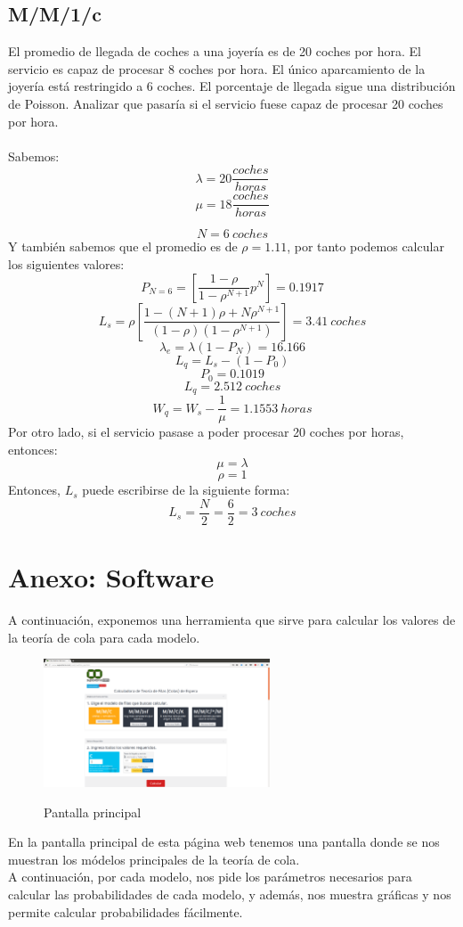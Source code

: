 \subsection{M/M/1/c}
El promedio de llegada de coches a una joyería es de 20 coches por hora. El servicio es capaz de procesar 8 coches por hora. El único aparcamiento de la joyería está restringido a 6 coches. El porcentaje de llegada sigue una distribución de Poisson. Analizar que pasaría si el servicio fuese capaz de procesar 20 coches por hora. \\ \\
Sabemos:
$$\lambda=20 \frac{coches}{horas} $$
$$ \mu = 18 \frac{coches}{horas} $$ 

$$ N = 6 ~ coches $$
Y también sabemos que el promedio es de $\rho=1.11$, por tanto podemos calcular los siguientes valores:
$$P_{N=6}=\left[\frac{1-\rho}{1-\rho^{N+1}}p^N\right]=0.1917$$
$$L_s=\rho \left[\frac{1-(N+1)\rho + N \rho ^{N+1}}{(1-\rho)(1-\rho^{N+1})}\right]=3.41 ~ coches$$
$$\lambda_e= \lambda(1-P_N)=16.166$$
$$L_q=L_s-(1-P_0)$$
$$P_0=0.1019$$
$$L_q=2.512 ~ coches $$
$$ W_q=W_s-\frac{1}{\mu}=1.1553 ~ horas$$
Por otro lado, si el servicio pasase a poder procesar 20 coches por horas, entonces:
$$\mu=\lambda$$
$$\rho=1$$
Entonces, $L_s$ puede escribirse de la siguiente forma:
$$L_s=\frac{N}{2}=\frac{6}{2}=3~ coches$$
\newpage

\section{Anexo: Software}

A continuación, exponemos una herramienta que sirve para calcular los valores de la teoría de cola para cada modelo.
\begin{figure}[h]
	\centering
	\includegraphics[width=0.6\textwidth]{soft1}
	\label{soft1}
	\caption{Pantalla principal}
\end{figure}
\newpage
En la pantalla principal de esta página web tenemos una pantalla donde se nos muestran los módelos principales de la teoría de cola. \\
A continuación, por cada modelo, nos pide los parámetros necesarios para calcular las probabilidades de cada modelo, y además, nos muestra gráficas y nos permite calcular probabilidades fácilmente.

